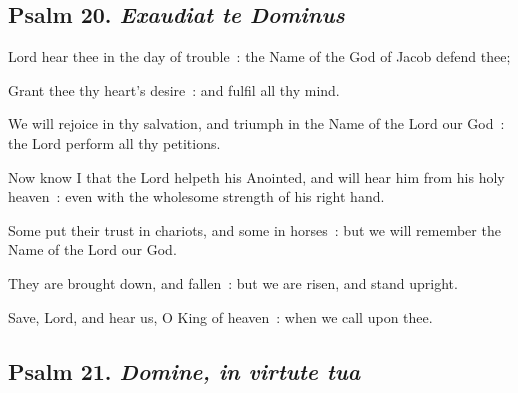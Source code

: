 \subsection{Psalm 20. \textit{Exaudiat te Dominus}}

 Lord hear thee in the day of trouble~: the Name of the God of Jacob defend thee;\par
{}
Grant thee thy heart's desire~: and fulfil all thy mind.\par
{}We will rejoice in thy salvation, and triumph in the Name of the Lord our God~: the Lord perform all thy petitions.\par
{}Now know I that the Lord helpeth his Anointed, and will hear him from his holy heaven~: even with the wholesome strength of his right hand.\par
{}Some put their trust in chariots, and some in horses~: but we will remember the Name of the Lord our God.\par
{}They are brought down, and fallen~: but we are risen, and stand upright.\par
{}Save, Lord, and hear us, O King of heaven~: when we call upon thee.\par

\subsection{Psalm 21. \textit{Domine, in virtute tua}}

